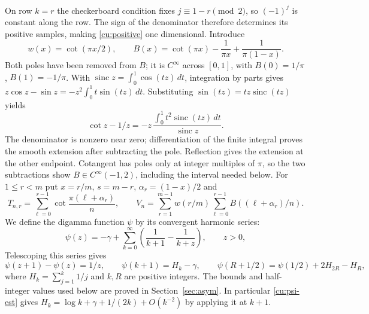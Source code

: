 On row $k=r$ the checkerboard condition fixes $j\equiv1-r\pmod2$,
so $(-1)^j$ is constant along the row. The sign of the denominator
therefore determines its positive samples, making \eqref{cu:positive}
one dimensional. Introduce
\begin{equation}\label{cu:wB}
 w(x)=\cot(\pi x/2),\qquad
 B(x)=\cot(\pi x)-\frac1{\pi x}+\frac1{\pi(1-x)}.
\end{equation}
Both poles have been removed from $B$; it is $C^\infty$ across $[0,1]$,
with $B(0)=1/\pi$, $B(1)=-1/\pi$.
With $\operatorname{sinc}z=\int_0^1\cos(tz)\,dt$, integration by parts gives
$z\cos z-\sin z=-z^2\int_0^1t\sin(tz)\,dt$.
Substituting $\sin(tz)=tz\operatorname{sinc}(tz)$ yields
\[
 \cot z-1/z=-z\,
 \frac{\int_0^1t^2\operatorname{sinc}(tz)\,dt}{\operatorname{sinc}z}.
\]
The denominator is nonzero near zero; differentiation of the finite
integral proves the smooth extension after subtracting the pole.
Reflection gives the extension at the other endpoint. Cotangent has
poles only at integer multiples of $\pi$, so the two subtractions
show $B\in C^\infty(-1,2)$, including the interval needed below.
 For $1\leq r<m$ put
$x=r/m$, $s=m-r$, $\alpha_r=(1-x)/2$ and
\[
 T_{n,r}=\sum_{\ell=0}^{r-1}\cot\frac{\pi(\ell+\alpha_r)}n,
 \qquad V_n=\sum_{r=1}^{m-1}w(r/m)
                    \sum_{\ell=0}^{r-1}B((\ell+\alpha_r)/n).
\]
We define the digamma function $\psi$ by its convergent harmonic series:
\begin{equation}\label{cu:psi}
 \psi(z)=-\gamma+\sum_{k=0}^\infty
          \left(\frac1{k+1}-\frac1{k+z}\right),\qquad z>0,
\end{equation}
Telescoping this series gives
\[
 \psi(z+1)-\psi(z)=1/z,\qquad
 \psi(k+1)=H_k-\gamma,\qquad
 \psi(R+1/2)=\psi(1/2)+2H_{2R}-H_R,
\]
where $H_k=\sum_{j=1}^k1/j$ and $k,R$ are positive integers.
The bounds and half-integer values used below are proved in
Section~\ref{sec:asym}. In particular \eqref{cu:psi-est} gives
$H_k=\log k+\gamma+1/(2k)+O(k^{-2})$ by applying it at $k+1$.

